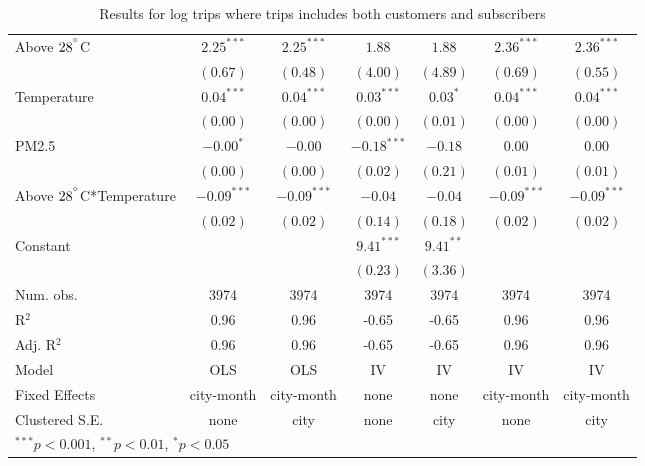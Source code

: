 \documentclass[12pt,letter paper]{article}
\begin{document}
\begin{table}[H]
\begin{center}
\begin{tabular}{l c c c c c c }
Above $28^{\degree}$C                & $2.25^{***}$  & $2.25^{***}$  & $1.88$        & $1.88$        & $2.36^{***}$  & $2.36^{***}$  \\
                        & $(0.67)$      & $(0.48)$      & $(4.00)$      & $(4.89)$      & $(0.69)$      & $(0.55)$      \\
Temperature             & $0.04^{***}$  & $0.04^{***}$  & $0.03^{***}$  & $0.03^{*}$    & $0.04^{***}$  & $0.04^{***}$  \\
                        & $(0.00)$      & $(0.00)$      & $(0.00)$      & $(0.01)$      & $(0.00)$      & $(0.00)$      \\
PM2.5                   & $-0.00^{*}$   & $-0.00$       & $-0.18^{***}$ & $-0.18$       & $0.00$        & $0.00$        \\
                        & $(0.00)$      & $(0.00)$      & $(0.02)$      & $(0.21)$      & $(0.01)$      & $(0.01)$      \\
Above $28^{\degree}$C*Temperature    & $-0.09^{***}$ & $-0.09^{***}$ & $-0.04$       & $-0.04$       & $-0.09^{***}$ & $-0.09^{***}$ \\
                        & $(0.02)$      & $(0.02)$      & $(0.14)$      & $(0.18)$      & $(0.02)$      & $(0.02)$      \\
Constant                &               &               & $9.41^{***}$  & $9.41^{**}$   &               &               \\
                        &               &               & $(0.23)$      & $(3.36)$      &               &               \\
\hline
Num. obs.               & 3974          & 3974          & 3974          & 3974          & 3974          & 3974          \\
R$^2$       & 0.96          & 0.96          & -0.65         & -0.65         & 0.96          & 0.96          \\
Adj. R$^2$  & 0.96          & 0.96          & -0.65         & -0.65         & 0.96          & 0.96          \\
Model & OLS & OLS & IV & IV & IV & IV \\
Fixed Effects & city-month & city-month & none & none & city-month & city-month \\
Clustered S.E. & none & city & none & city & none & city \\
\hline
\multicolumn{7}{l}{\scriptsize{$^{***}p<0.001$, $^{**}p<0.01$, $^*p<0.05$}}
\end{tabular}
\caption{Results for log trips where trips includes both customers and subscribers}
\label{table:coefficients}
\end{center}
\end{table}
\egroup
\end{document}
